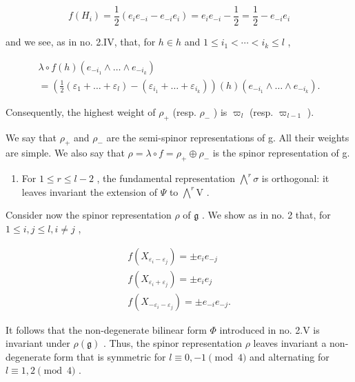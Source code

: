\[
f (H _ {i}) = \frac {1}{2} (e _ {i} e _ {- i} - e _ {- i} e _ {i}) = e _ {i} e _ {- i} - \frac {1}{2} = \frac {1}{2} - e _ {- i} e _ {i}
\]

and we see, as in no. 2.IV, that, for \(h \in h\) and \(1 \leq i_{1} < \cdots < i_{k} \leq l\) ,

\[
\begin{array}{l} \lambda \circ f (h) (e _ {- i _ {1}} \wedge \dots \wedge e _ {- i _ {k}}) \\ = (\frac {1}{2} (\varepsilon_ {1} + \dots + \varepsilon_ {l}) - (\varepsilon_ {i _ {1}} + \dots + \varepsilon_ {i _ {k}})) (h) (e _ {- i _ {1}} \wedge \dots \wedge e _ {- i _ {k}}). \end{array}
\]

Consequently, the highest weight of \(\rho_{+}\) (resp. \(\rho_{-}\) ) is \(\varpi_{l}\) (resp. \(\varpi_{l-1}\) ).

We say that \(\rho_{+}\) and \(\rho_{-}\) are the semi-spinor representations of g. All their weights are simple. We also say that \(\rho = \lambda \circ f = \rho_{+} \oplus \rho_{-}\) is the spinor representation of g.

\begin{enumerate}
\def\labelenumi{(\Alph{enumi})}
\setcounter{enumi}{21}
\tightlist
\item
  For \(1 \leq r \leq l - 2\) , the fundamental representation \(\bigwedge^{r} \sigma\) is orthogonal: it leaves invariant the extension of \(\varPsi\) to \(\bigwedge^{r} \mathrm{V}\) .
\end{enumerate}

Consider now the spinor representation \(\rho\) of \(\mathfrak{g}\) . We show as in no. 2 that, for \(1 \leq i, j \leq l, i \neq j\) ,

\[
\begin{array}{r} f (X _ {\varepsilon_ {i} - \varepsilon_ {j}}) = \pm e _ {i} e _ {- j} \\ f (X _ {\varepsilon_ {i} + \varepsilon_ {j}}) = \pm e _ {i} e _ {j} \\ f (X _ {- \varepsilon_ {i} - \varepsilon_ {j}}) = \pm e _ {- i} e _ {- j}. \end{array}
\]

It follows that the non-degenerate bilinear form \(\varPhi\) introduced in no. 2.V is invariant under \(\rho(\mathfrak{g})\) . Thus, the spinor representation \(\rho\) leaves invariant a non-degenerate form that is symmetric for \(l \equiv 0, -1 \pmod{4}\) and alternating for \(l \equiv 1, 2 \pmod{4}\) .

